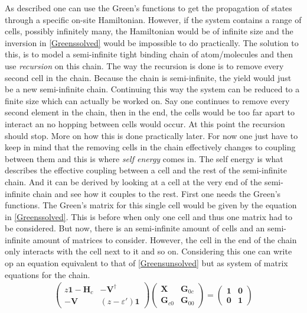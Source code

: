 As described  one can use the Green's functions to get the propagation of states through a specific on-site Hamiltonian. However, if the system contains a range of cells, possibly infinitely many, the Hamiltonian would be of infinite size and the inversion in \cref{Greenssolved} would be impossible to do practically. The solution to this, is to model a semi-infinite tight binding chain of atom/molecules and then use \textit{recursion} on this chain. The way the recursion is done is to remove every second cell in the chain. Because the chain is semi-infinite, the yield would just be a new semi-infinite chain. Continuing this way the system can be reduced to a finite size which can actually be worked on. Say one continues to remove every second element in the chain, then in the end, the cells would be too far apart to interact an no hopping between cells would occur. At this point the recursion should stop. More on how this is done practically later.  For now one just have to keep in mind that the removing cells in the chain effectively changes to coupling between them and this is where \textit{self energy} comes in. The self energy is what describes the effective coupling between a cell and the rest of the semi-infinite chain. And it can be derived by looking at a cell at the very end of the semi-infinite chain and see how it couples to the rest. First one needs the Green's functions. The Green's matrix for this single cell would be given by the equation in \cref{Greenssolved}. This is before when only one cell and thus one matrix had to be considered. But now, there is an semi-infinite amount of cells and an semi-infinite amount of matrices to consider. However, the cell in the end of the chain only interacts with the cell next to it and so on. Considering this one can write op an equation equivalent to that of \cref{Greensunsolved} but as system of matrix equations for the chain.
\begin{align}\label{Greenssystem}
\begin{pmatrix}
    z\mathbf{1}-\mathbf{H}_c & -\mathbf{V}^{\dagger} \\ -\mathbf{V} & (z-\varepsilon')\mathbf{1} 
\end{pmatrix}
\begin{pmatrix}
\mathbf{X} & \mathbf{G}_{0c}\\
\mathbf{G}_{c0} & \mathbf{G}_{00}
\end{pmatrix}
=
\begin{pmatrix}
\mathbf{1} & \mathbf{0} \\
\mathbf{0} & \mathbf{1}
\end{pmatrix}
\end{align}
